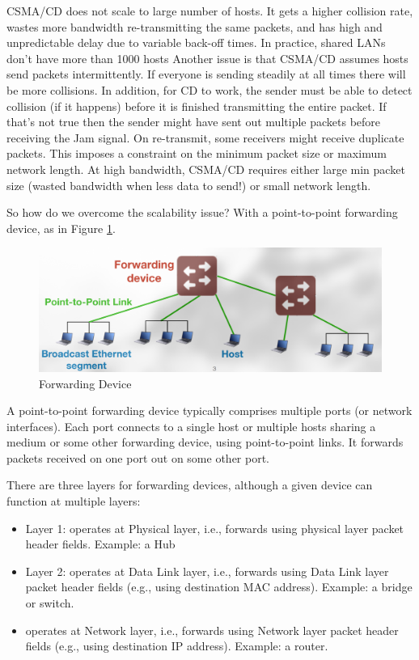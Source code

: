 CSMA/CD does not scale to large number of hosts.
It gets a higher collision rate, wastes more bandwidth
re-transmitting the same packets, and has high and unpredictable
delay due to variable back-off times.
In practice, shared LANs don't have more than 1000 hosts
Another issue is that CSMA/CD assumes hosts send packets intermittently.
If everyone is sending steadily at all times there will be
more collisions. In addition, for CD to work, the sender must be
able to detect collision (if it
happens) before it is finished transmitting the entire packet.
If that's not true then the sender might have sent out multiple
packets before receiving the Jam signal. On re-transmit,
some receivers might receive duplicate packets. This
imposes a constraint on the
minimum packet size or maximum network length.
At high bandwidth, CSMA/CD requires either
large min packet size (wasted bandwidth when less data to send!)
or small network length.

So how do we overcome the scalability issue?
With a point-to-point forwarding device, as in Figure
\ref{fig:forwardingdevice}.
\begin{figure}
    \includegraphics{images/forwarding-device.png}
    \caption{Forwarding Device}
    \label{fig:forwardingdevice}
\end{figure}
A point-to-point forwarding device
typically comprises multiple ports (or network interfaces).
Each port connects to a single host or multiple hosts sharing a
medium or some other forwarding device, using point-to-point links.
It forwards packets received on one port out on some other port.

There are three layers for forwarding devices, although a given
device can function at multiple layers:
\begin{itemize}
    \item Layer 1: operates at Physical layer, i.e.,
          forwards using physical layer
          packet header fields. Example: a Hub
    \item Layer 2: operates at Data Link layer, i.e.,
          forwards using Data Link layer
          packet header fields (e.g., using destination MAC address).
          Example: a bridge or switch.
    \item operates at Network layer, i.e., forwards using Network layer
          packet header fields (e.g., using destination IP address).
          Example: a router.
\end{itemize}

